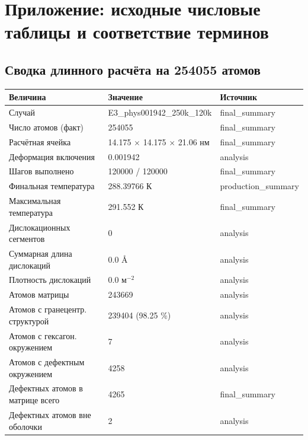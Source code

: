 \documentclass[12pt,a4paper]{extarticle}
\newcommand{\hh}[1]{\small\textbf{#1}}
\begin{document}
\section{Приложение: исходные числовые таблицы и соответствие терминов}

\subsection{Сводка длинного расчёта на 254055 атомов}
\begin{center}
\small
\setlength{\tabcolsep}{6pt}
\renewcommand{\arraystretch}{1.2}
\begin{tabular}{p{67mm} p{52mm} p{38mm}}
\toprule
\hh{Величина} & \hh{Значение} & \hh{Источник} \\
\midrule
Случай & E3\_phys001942\_250k\_120k & final\_summary \\
Число атомов (факт) & 254055 & final\_summary \\
Расчётная ячейка & 14.175 $\times$ 14.175 $\times$ 21.06 нм & final\_summary \\
Деформация включения & 0.001942 & analysis \\
Шагов выполнено & 120000 / 120000 & final\_summary \\
Финальная температура & 288.39766 К & production\_summary \\
Максимальная температура & 291.552 К & final\_summary \\
Дислокационных сегментов & 0 & analysis \\
Суммарная длина дислокаций & 0.0 Å & analysis \\
Плотность дислокаций & 0.0 м$^{-2}$ & analysis \\
Атомов матрицы & 243669 & analysis \\
Атомов с гранецентр. структурой & 239404 (98.25 \%) & analysis \\
Атомов с гексагон. окружением & 7 & analysis \\
Атомов с дефектным окружением & 4258 & analysis \\
Дефектных атомов в матрице всего & 4265 & final\_summary \\
Дефектных атомов вне оболочки & 2 & analysis \\
\bottomrule
\end{tabular}
\end{center}
\end{document}
